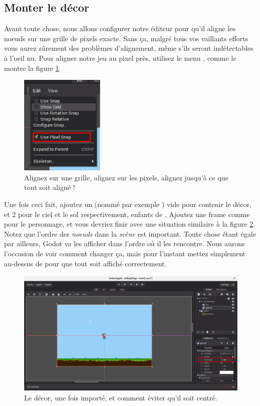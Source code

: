 \subsection{Monter le décor}

Avant toute chose, nous allons configurer notre éditeur pour qu'il aligne les noeuds sur une grille de pixels exacte. Sans ça, malgré tous vos vaillants efforts vous aurez sûrement des problèmes d'alignement, même s'ils seront indétectables à l'oeil nu. Pour aligner notre jeu au pixel près, utilisez le menu , comme le montre la figure \ref{lvl1-pixelsnap}.

\begin{figure}
  \begin{center}
    \includegraphics[width=4cm]{img/lvl1-pixelsnap.png}
  \end{center}
  \caption{\label{lvl1-pixelsnap} Alignez sur une grille, alignez sur les pixels, alignez jusqu'à ce que tout soit aligné !}
\end{figure}

Une fois ceci fait, ajoutez un  (nommé par exemple ) vide pour contenir le décor, et 2  pour le ciel et le sol respectivement, enfants de . Ajoutez une frame comme pour le personnage, et vous devriez finir avec une situation similaire à la figure \ref{lvl1-centered}. Notez que l'ordre des \emph{noeuds} dans la \emph{scène} est important. Toute chose étant égale par ailleurs, Godot va les afficher dans l'ordre où il les rencontre. Nous aurons l'occasion de voir comment changer ça, mais pour l'instant mettez simplement  au-dessus de  pour que tout soit affiché correctement.

\begin{figure}
  \begin{center}
    \includegraphics[width=12cm]{img/lvl1-centered.png}
  \end{center}
  \caption{\label{lvl1-centered} Le décor, une fois importé, et comment éviter qu'il soit centré.}
\end{figure}

